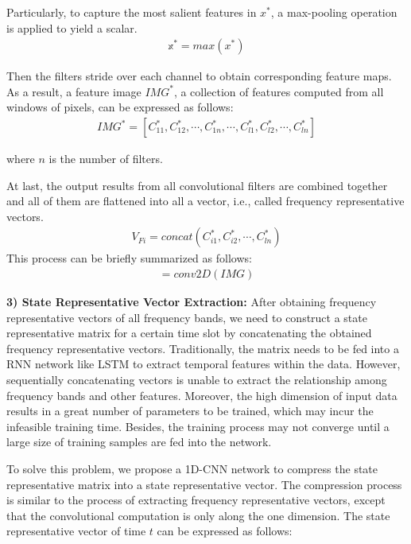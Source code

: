\documentclass[10pt,conference,letterpaper]{IEEEtran}
\begin{document}
Particularly, to capture the most salient features in $x^*$, a max-pooling operation is applied to yield a scalar. 
\begin{eqnarray}
\mathbb{x}^\ast = max(x^*)
\end{eqnarray}

Then the filters stride over each channel to obtain corresponding feature maps. As a result, a feature image $\textit{IMG}^{\ast}$, a collection of features computed from all windows of pixels, can be expressed as follows:
\begin{eqnarray}
\textit{IMG}^{\ast} =  [C_{11}^{\ast}, C_{12}^{\ast}, \cdots, C_{1n}^{\ast}, \cdots, C_{l1}^{\ast}, C_{l2}^{\ast}, \cdots, C_{ln}^{\ast}]
\end{eqnarray}

where $n$ is the number of filters.

At last, the output results from all convolutional filters are combined together and all of them are flattened into all a vector, i.e., called frequency representative vectors.
\begin{eqnarray}
V_{Fi} = concat( C_{i1}^{\ast}, C_{i2}^{\ast}, \cdots, C_{ln}^{\ast})
\end{eqnarray}
This process can be briefly summarized as follows:
\begin{eqnarray}
[V_{F1} , V_{F2} , \cdots, V_{Fl} ] = conv2D(\textit{IMG})
\end{eqnarray}

\textbf{3) State Representative Vector Extraction: }After obtaining frequency representative vectors of all frequency bands, we need to construct a state representative matrix for a certain time slot by concatenating the obtained frequency representative vectors. Traditionally, the matrix needs to be fed into a RNN network like LSTM to extract temporal features within the data. However, sequentially concatenating vectors is unable to extract the relationship among frequency bands and other features. Moreover, the high dimension of input data results in a great number of parameters to be trained, which may incur the infeasible training time. Besides, the training process may not converge until a large size of training samples are fed into the network.

To solve this problem, we propose a 1D-CNN network to compress the state representative matrix into a state representative vector. The compression process is similar to the process of extracting frequency representative vectors, except that the convolutional computation is only along the one dimension. The state representative vector of time $t$ can be expressed as follows: 
\end{document}
